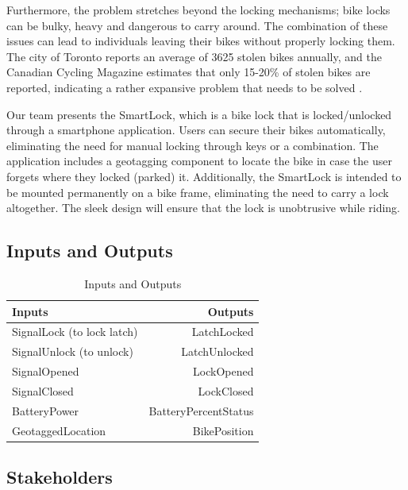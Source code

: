 \documentclass{article}
\begin{document}
Furthermore, the problem stretches beyond the locking mechanisms; bike locks can be bulky, heavy and dangerous to carry around.  The combination of these issues can lead to individuals leaving their bikes without properly locking them.  The city of Toronto reports an average of 3625 stolen bikes annually, and the Canadian Cycling Magazine estimates that only 15-20\% of stolen bikes are reported, indicating a rather expansive problem that needs to be solved \cite{web1} \cite{web2}. %

Our team presents the SmartLock, which is a bike lock that is locked/unlocked through a smartphone application.  Users can secure their bikes automatically, eliminating the need for manual locking through keys or a combination.  The application includes a geotagging component to locate the bike in case the user forgets where they locked (parked) it.  Additionally, the SmartLock is intended to be mounted permanently on a bike frame, eliminating the need to carry a lock altogether.  The sleek design will ensure that the lock is unobtrusive while riding. 


\subsection{Inputs and Outputs}

\begin{table}[hp]
  \begin{center}
  \caption{Inputs and Outputs} \label{TblTInputsAndOutputs}
    \begin{tabular}{| l | r |}
    \hline
      \textbf{Inputs} & \textbf{Outputs}\\
      \hline
      SignalLock (to lock latch)  & LatchLocked\\
	    SignalUnlock (to unlock) & LatchUnlocked\\
	    SignalOpened & LockOpened\\
	    SignalClosed & LockClosed\\
	    BatteryPower & BatteryPercentStatus\\
	    GeotaggedLocation & BikePosition\\
	    \hline
    \end{tabular}
  \end{center}
\end{table}

\subsection{Stakeholders}
\end{document}
